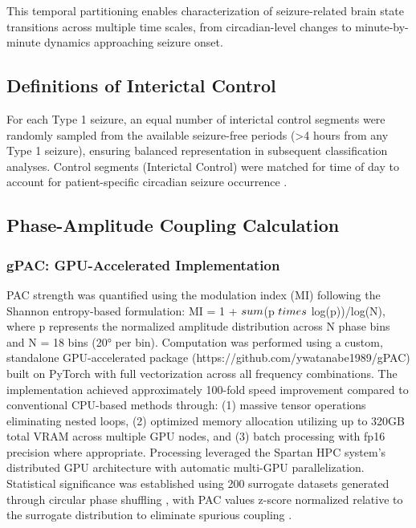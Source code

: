 This temporal partitioning enables characterization of seizure-related brain state transitions across multiple time scales, from circadian-level changes to minute-by-minute dynamics approaching seizure onset.

\subsection{Definitions of Interictal Control}

For each Type 1 seizure, an equal number of interictal control segments were randomly sampled from the available seizure-free periods (>4 hours from any Type 1 seizure), ensuring balanced representation in subsequent classification analyses. Control segments (Interictal Control) were matched for time of day to account for patient-specific circadian seizure occurrence \cite{Kuhlmann2018SeizurePA}.


\subsection{Phase-Amplitude Coupling Calculation}
\subsubsection{gPAC: GPU-Accelerated Implementation}
PAC strength was quantified using the modulation index (MI) \cite{Tort2010MeasuringPCE} following the Shannon entropy-based formulation: MI = 1 + $\\sum$(p $\\times$ log(p))/log(N), where p represents the normalized amplitude distribution across N phase bins and N = 18 bins (20° per bin). Computation was performed using a custom, standalone GPU-accelerated package (https://github.com/ywatanabe1989/gPAC) built on PyTorch with full vectorization across all frequency combinations. The implementation achieved approximately 100-fold speed improvement compared to conventional CPU-based methods \cite{Combrisson2020TensorpacAOAH} through: (1) massive tensor operations eliminating nested loops, (2) optimized memory allocation utilizing up to 320GB total VRAM across multiple GPU nodes, and (3) batch processing with fp16 precision where appropriate. Processing leveraged the Spartan HPC system's distributed GPU architecture with automatic multi-GPU parallelization. Statistical significance was established using 200 surrogate datasets generated through circular phase shuffling \cite{Tort2010MeasuringPCE,Aru2014UntanglingCCD}, with PAC values z-score normalized relative to the surrogate distribution to eliminate spurious coupling \cite{Jensen2016DiscriminatingVFR}.

